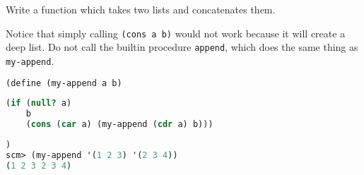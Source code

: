 \question Write a function which takes two lists and concatenates them.

Notice that simply calling {\tt (cons a b)} would not work because it will
create a deep list. Do not call the builtin procedure \texttt{append}, which
does the same thing as \texttt{my-append}.

\begin{lstlisting}[language=Scheme]
(define (my-append a b)
\end{lstlisting}
\begin{solution}[1.5in]
\begin{lstlisting}[language=Scheme]
    (if (null? a)
    b
    (cons (car a) (my-append (cdr a) b)))
\end{lstlisting}
\end{solution}
\begin{lstlisting}[language=Scheme]
)
scm> (my-append '(1 2 3) '(2 3 4))
(1 2 3 2 3 4)
\end{lstlisting}
